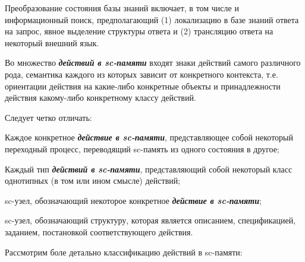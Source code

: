Преобразование состояния базы знаний включает, в том числе и информационный поиск, предполагающий (1) локализацию в базе знаний ответа на запрос, явное выделение структуры ответа и (2) трансляцию ответа на некоторый внешний язык.

Во множество \textbf{\textit{действий в sc-памяти}} входят знаки действий самого различного рода, семантика каждого из которых зависит от конкретного контекста, т.е. ориентации действия на какие-либо конкретные объекты и принадлежности действия какому-либо конкретному классу действий.

Следует четко отличать:
\begin{textitemize}
	\item Каждое конкретное \textbf{\textit{действие в sc-памяти}}, представляющее собой некоторый переходный процесс, переводящий sc-память из одного состояния в другое;
	\item Каждый тип \textbf{\textit{действий в sc-памяти}}, представляющий собой некоторый класс однотипных (в том или ином смысле) действий;
	\item sc-узел, обозначающий некоторое конкретное \textbf{\textit{действие в sc-памяти}};
	\item sc-узел, обозначающий структуру, которая является описанием, спецификацией, заданием, постановкой соответствующего действия.
\end{textitemize}

Рассмотрим боле детально классификацию действий в sc-памяти:

